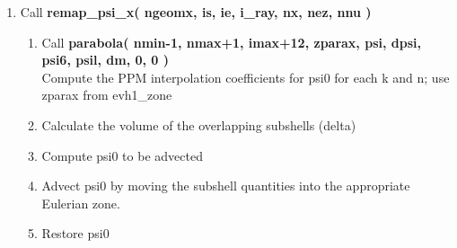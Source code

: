 \documentclass[11pt,doublespace]{article}
\begin{document}
\begin{itemize}
\begin{enumerate}
\begin{enumerate}
\begin{enumerate}
\end{enumerate}

  \item Call {\bf remap\_psi\_x( ngeomx, is, ie, i\_ray, nx, nez, nnu )}

\begin{enumerate}

  \item Call {\bf parabola( nmin-1, nmax+1, imax+12, zparax, psi, dpsi, psi6, psil, dm, 0, 0 )}\\
  Compute the PPM interpolation coefficients for psi0 for each k and n; use zparax from evh1\_zone

  \item Calculate the volume of the overlapping subshells (delta)

  \item Compute psi0 to be advected

  \item Advect psi0 by moving the subshell quantities into the appropriate Eulerian zone.

  \item Restore psi0


\end{enumerate}
\end{enumerate}
\end{enumerate}
\end{itemize}
\end{document}
